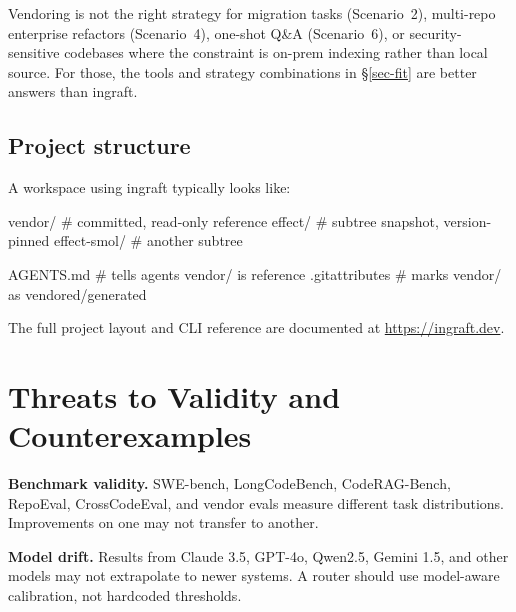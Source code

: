 \documentclass[
  11pt,
  letterpaper,
  numbers=noendperiod,
  parskip=half]{scrartcl}
\newenvironment{Shaded}{}{}
\newcommand{\NormalTok}[1]{\textcolor[rgb]{0.14,0.16,0.18}{#1}}
\begin{document}
Vendoring is not the right strategy for migration tasks (Scenario~2),
multi-repo enterprise refactors (Scenario~4), one-shot Q\&A
(Scenario~6), or security-sensitive codebases where the constraint is
on-prem indexing rather than local source. For those, the tools and
strategy combinations in \S\ref{sec-fit} are better answers than
ingraft.

\subsection*{Project structure}

A workspace using ingraft typically looks like:

\begin{Shaded}
\begin{Highlighting}[]
\NormalTok{vendor/                         \# committed, read{-}only reference}
\NormalTok{  effect/                        \# subtree snapshot, version{-}pinned}
\NormalTok{  effect{-}smol/                   \# another subtree}

\NormalTok{AGENTS.md                        \# tells agents \textquotesingle vendor/ is reference\textquotesingle}
\NormalTok{.gitattributes                   \# marks vendor/ as vendored/generated}
\end{Highlighting}
\end{Shaded}

\noindent The full project layout and CLI reference are documented at
\url{https://ingraft.dev}.

\iffalse
\section{Threats to Validity and Counterexamples}\label{sec-threats}

\textbf{Benchmark validity.} SWE-bench, LongCodeBench, CodeRAG-Bench,
RepoEval, CrossCodeEval, and vendor evals measure different task
distributions. Improvements on one may not transfer to another.

\textbf{Model drift.} Results from Claude 3.5, GPT-4o, Qwen2.5, Gemini
1.5, and other models may not extrapolate to newer systems. A router
should use model-aware calibration, not hardcoded thresholds.
\end{document}
